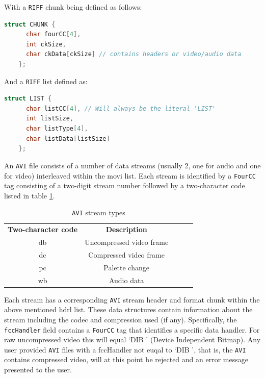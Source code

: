 \documentclass[paper=a4, fontsize=11pt,twoside]{scrartcl}    %
\numberwithin{table}{section}
\numberwithin{figure}{section}
\begin{document}
\noindent
With a \texttt{RIFF} chunk being defined as follows:

\begin{lstlisting}[language=C, caption={\texttt{RIFF} chunk}, frame=single]
	struct CHUNK {
	  char fourCC[4],
	  int ckSize,
	  char ckData[ckSize] // contains headers or video/audio data
	};
\end{lstlisting}

\noindent
And a \texttt{RIFF} list defined as:

\begin{lstlisting}[language=C, caption={\texttt{RIFF} list}, frame=single]
	struct LIST {
	  char listCC[4], // Will always be the literal 'LIST'
	  int listSize,
	  char listType[4],
	  char listData[listSize]
	};
\end{lstlisting}

\noindent
An \texttt{AVI} file consists of a number of data streams (usually 2, one for audio and one for video) interleaved within the movi list. Each stream is identified by a \texttt{FourCC} tag consisting of a two-digit stream number followed by a two-character code listed in table \ref{table:fourcc}.

\begin{table}[h]
\centering
\begin{tabular}{|c|c|lll}
\cline{1-2}
\textbf{Two-character code} & \textbf{Description}       \\ \cline{1-2}
db                          & Uncompressed video frame   \\ \cline{1-2}
dc                          & Compressed video frame     \\ \cline{1-2}
pc                          & Palette change             \\ \cline{1-2}
wb                          & Audio data                 \\ \cline{1-2}
\end{tabular}
\caption{\texttt{AVI} stream types}
\label{table:fourcc}
\end{table}

\noindent
Each stream has a corresponding \texttt{AVI} stream header and format chunk within the above mentioned hdrl list. These data structures contain information about the stream including the codec and compression used (if any). Specifically, the \texttt{fccHandler} field contains a \texttt{FourCC} tag that identifies a specific data handler. For raw uncompressed video this will equal `DIB ' (Device Independent Bitmap). Any user provided \texttt{AVI} files with a fccHandler not euqal to `DIB ', that is, the \texttt{AVI} contains compressed video, will at this point be rejected and an error message presented to the user.
\end{document}
